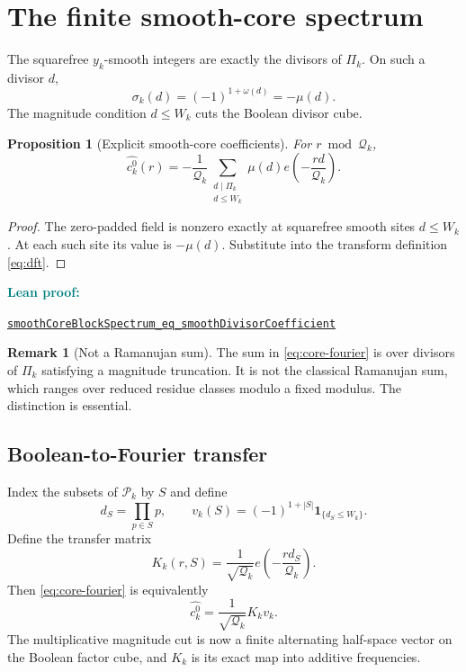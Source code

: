 \documentclass[11pt]{article}
\newtheorem{proposition}[theorem]{Proposition}
\theoremstyle{definition}
\newtheorem{remark}[theorem]{Remark}
\newcommand{\one}{\mathbf 1}
\newcommand{\leanxref}[3]{%
  \par\smallskip
  {\small\noindent\textcolor{teal}{\textbf{#1:}}\par
  \noindent\href{#3}{\nolinkurl{#2}}\par}
  \smallskip
}
\begin{document}
\section{The finite smooth-core spectrum}

The squarefree $y_k$-smooth integers are exactly the divisors of $\Pi_k$.  On such a divisor $d$,
\[
\sigma_k(d)=(-1)^{1+\omega(d)}=-\mu(d).
\]
The magnitude condition $d\le W_k$ cuts the Boolean divisor cube.

\begin{proposition}[Explicit smooth-core coefficients]\label{prop:core-fourier}
For $r\bmod\mathcal Q_k$,
\begin{equation}\label{eq:core-fourier}
\boxed{
\widehat{c_k^0}(r)
=-\frac1{\mathcal Q_k}
\sum_{\substack{d\mid\Pi_k\\d\le W_k}}
\mu(d)e\!\left(-\frac{rd}{\mathcal Q_k}\right).}
\end{equation}
\end{proposition}

\begin{proof}
The zero-padded field is nonzero exactly at squarefree smooth sites $d\le W_k$.  At each such site its value is $-\mu(d)$.  Substitute into the transform definition \eqref{eq:dft}.
\end{proof}
\leanxref{Lean proof}{smoothCoreBlockSpectrum_eq_smoothDivisorCoefficient}{https://github.com/OVVO-Financial/prime-wheel-mobius/blob/main/formalization/RHLean/Analysis/PrimeWheelArithmeticSpectrum.lean}

\begin{remark}[Not a Ramanujan sum]
The sum in \eqref{eq:core-fourier} is over divisors of $\Pi_k$ satisfying a magnitude truncation.  It is not the classical Ramanujan sum, which ranges over reduced residue classes modulo a fixed modulus.  The distinction is essential.
\end{remark}

\subsection{Boolean-to-Fourier transfer}

Index the subsets of $\mathcal P_k$ by $S$ and define
\[
d_S=\prod_{p\in S}p,
\qquad
v_k(S)=(-1)^{1+|S|}\one_{\{d_S\le W_k\}}.
\]
Define the transfer matrix
\[
K_k(r,S)=\frac1{\sqrt{\mathcal Q_k}}
e\!\left(-\frac{rd_S}{\mathcal Q_k}\right).
\]
Then \eqref{eq:core-fourier} is equivalently
\begin{equation}\label{eq:boolean-transfer}
\widehat{c_k^0}
=\frac1{\sqrt{\mathcal Q_k}}K_kv_k.
\end{equation}
The multiplicative magnitude cut is now a finite alternating half-space vector on the Boolean factor cube, and $K_k$ is its exact map into additive frequencies.
\end{document}
